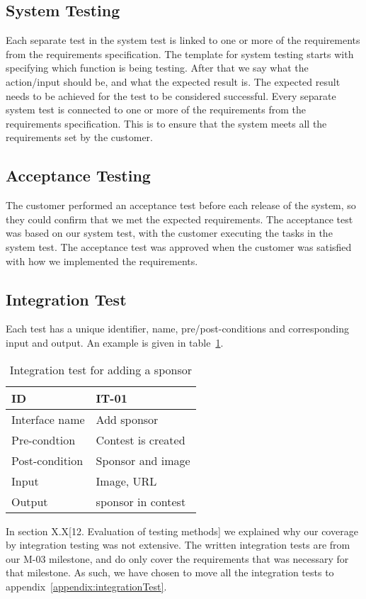 \subsection{System Testing} Each separate test in the system test is linked to
one or more of the requirements from the requirements specification. The
template for system testing starts with specifying which function is being
testing.  After that we say what the action/input should be, and what the
expected result is. The expected result needs to be achieved for the test to be
considered successful. Every separate system test is connected to one or more
of the requirements from the requirements specification. This is to ensure that
the system meets all the requirements set by the customer.


\subsection{Acceptance Testing}
The customer performed an acceptance test before each release of the system, so
they could confirm that we met the expected requirements.  The acceptance test
was based on our system test, with the customer executing the tasks in the
system test. The acceptance test was approved when the customer was satisfied
with how we implemented the requirements.

\subsection{Integration Test}
Each test has a unique identifier, name, pre/post-conditions and corresponding
input and output. An example is given in table~\ref{table:integrationTest}.

\begin{longtable}{|l|l|}
    \caption{Integration test for adding a sponsor} \label{table:integrationTest}\\
\hline
ID & IT-01\\\hline
Interface name & Add sponsor\\\hline
Pre-condtion & Contest is created\\\hline
Post-condition & Sponsor and image\\\hline
Input & Image, URL\\\hline
Output & sponsor in contest\\\hline
\end{longtable}

In section X.X[12. Evaluation of testing methods] we explained why our coverage
by integration testing was not extensive. The written integration tests are
from our M-03 milestone, and do only cover the requirements that was necessary
for that milestone. As such, we have chosen to move all the integration tests
to appendix~\ref{appendix:integrationTest}.

